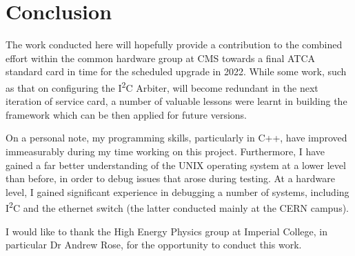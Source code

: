 \documentclass[a4paper,11pt,twocolumn]{article}
\begin{document}
	\section{Conclusion} 
	The work conducted here will hopefully provide a contribution to the combined effort within the common hardware group at CMS towards a final ATCA standard card in time for the scheduled upgrade in 2022. While some work, such as that on configuring the I\textsuperscript{2}C Arbiter, will become redundant in the next iteration of service card, a number of valuable lessons were learnt in building the framework which can be then applied for future versions. 

	On a personal note, my programming skills, particularly in C++, have improved immeasurably during my time working on this project. Furthermore, I have gained a far better understanding of the UNIX operating system at a lower level than before, in order to debug issues that arose during testing. At a hardware level, I gained significant experience in debugging a number of systems, including I\textsuperscript{2}C and the ethernet switch (the latter conducted mainly at the CERN campus). 
	
	I would like to thank the High Energy Physics group at Imperial College, in particular Dr Andrew Rose, for the opportunity to conduct this work.
	
	
	
	
\end{document}
